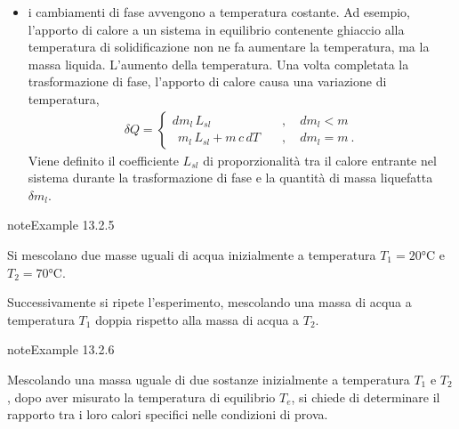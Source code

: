 \documentclass[letterpaper,10pt,italian]{jupyterBook}
\begin{document}
\begin{itemize}
\item {} 
\sphinxAtStartPar
i cambiamenti di fase avvengono a temperatura costante. Ad esempio, l’apporto di calore a un sistema in equilibrio contenente ghiaccio alla temperatura di solidificazione non ne fa aumentare la temperatura, ma la massa liquida. L’aumento della temperatura. Una volta completata la trasformazione di fase, l’apporto di calore causa una variazione di temperatura,
\begin{equation*}
\begin{split}\delta Q = \begin{cases}
      d m_{l} \, L_{sl}                 \quad & , \quad {d m_l < m} \\
    \ \ m_{l} \, L_{sl} + m \, c \, d T \quad & , \quad {d m_l = m} \ .
    \end{cases}\end{split}
\end{equation*}
\sphinxAtStartPar
Viene definito  il coefficiente \(L_{sl}\) di proporzionalità tra il calore entrante nel sistema durante la trasformazione di fase e la quantità di massa liquefatta \(\delta m_l\).

\end{itemize}
\label{ch/thermodynamics/foundation-experiments:thermodynamics:history:heat-capacity:1}
\begin{sphinxadmonition}{note}{Example 13.2.5}



\sphinxAtStartPar
Si mescolano due masse uguali di acqua inizialmente a temperatura \(T_1 = 20 \text{°C}\) e \(T_2 = 70 \text{°C}\).

\sphinxAtStartPar
Successivamente si ripete l’esperimento, mescolando una massa di acqua a temperatura \(T_1\) doppia rispetto alla massa di acqua a \(T_2\).
\end{sphinxadmonition}
\label{ch/thermodynamics/foundation-experiments:thermodynamics:history:heat-capacity:2}
\begin{sphinxadmonition}{note}{Example 13.2.6}



\sphinxAtStartPar
Mescolando una massa uguale di due sostanze inizialmente a temperatura \(T_1\)  e \(T_2\), dopo aver misurato la temperatura di equilibrio \(T_e\), si chiede di determinare il rapporto tra i loro calori specifici nelle condizioni di prova.
\end{sphinxadmonition}
\label{ch/thermodynamics/foundation-experiments:thermodynamics:history:heat-capacity:3}
\end{document}
